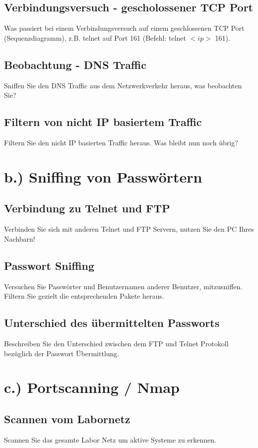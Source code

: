 \documentclass[a4paper]{report}
\begin{document}
\subsection{Verbindungsversuch - gescholossener TCP Port}
Was passiert bei einem Verbindungsversuch auf einem geschlossenen TCP Port
(Sequenzdiagramm), z.B. telnet auf Port 161 (Befehl: telnet $<ip>$ 161).

\subsection{Beobachtung - DNS Traffic}
Sniffen Sie den DNS Traffic aus dem Netzwerkverkehr heraus, was beobachten Sie?

\subsection{Filtern von nicht IP basiertem Traffic}
Filtern Sie den nicht IP basierten Traffic heraus. Was bleibt nun noch übrig?


\section{b.) Sniffing von Passwörtern}
\subsection{Verbindung zu Telnet und FTP}
Verbinden Sie sich mit anderen Telnet und FTP Servern, nutzen Sie den PC Ihres Nachbarn!
\subsection{Passwort Sniffing}
Versuchen Sie Passwörter und Benutzernamen anderer Benutzer, mitzusniffen. Filtern Sie gezielt die entsprechenden Pakete heraus.
\subsection{Unterschied des übermittelten Passworts}
Beschreiben Sie den Unterschied zwischen dem FTP und Telnet Protokoll bezüglich der Passwort Übermittlung.

\section{c.) Portscanning / Nmap}
\subsection{Scannen vom Labornetz}
Scannen Sie das gesamte Labor Netz um aktive Systeme zu erkennen.
\end{document}
